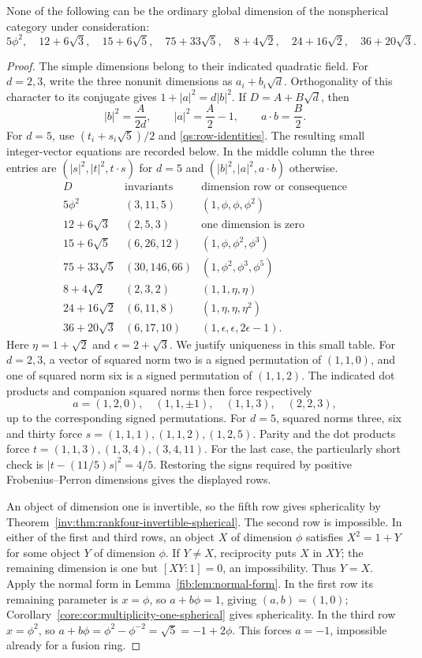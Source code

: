 \begin{lemma}\label{qs:ordinary-endpoints}
None of the following can be the ordinary global dimension of the
nonspherical category under consideration:
\[
 5\phi^2,\quad 12+6\sqrt3,\quad15+6\sqrt5,\quad
 75+33\sqrt5,\quad8+4\sqrt2,\quad24+16\sqrt2,\quad36+20\sqrt3.
\]
\end{lemma}
\begin{proof}
The simple dimensions belong to their indicated quadratic field.
For $d=2,3$, write the three nonunit dimensions as $a_i+b_i\sqrt d$.
Orthogonality of this character to its conjugate gives
$1+|a|^2=d|b|^2$. If $D=A+B\sqrt d$, then
\[
 |b|^2=\frac A{2d},\qquad |a|^2=\frac A2-1,
 \qquad a\cdot b=\frac B2.
\]
For $d=5$, use $(t_i+s_i\sqrt5)/2$ and
\eqref{qs:row-identities}. The resulting small integer-vector equations
are recorded below. In the middle column the three entries are
$(|s|^2,|t|^2,t\cdot s)$ for $d=5$ and
$(|b|^2,|a|^2,a\cdot b)$ otherwise.
\[
\begin{array}{c|c|l}
D&\text{invariants}&\text{dimension row or consequence}\\\hline
5\phi^2&(3,11,5)&(1,\phi,\phi,\phi^2)\\
12+6\sqrt3&(2,5,3)&\text{one dimension is zero}\\
15+6\sqrt5&(6,26,12)&(1,\phi,\phi^2,\phi^3)\\
75+33\sqrt5&(30,146,66)&(1,\phi^2,\phi^3,\phi^5)\\
8+4\sqrt2&(2,3,2)&(1,1,\eta,\eta)\\
24+16\sqrt2&(6,11,8)&(1,\eta,\eta,\eta^2)\\
36+20\sqrt3&(6,17,10)&(1,\epsilon,\epsilon,2\epsilon-1).
\end{array}
\]
Here $\eta=1+\sqrt2$ and $\epsilon=2+\sqrt3$.
We justify uniqueness in this small table. For $d=2,3$, a vector
of squared norm two is a signed permutation of $(1,1,0)$, and one
of squared norm six is a signed permutation of $(1,1,2)$.
The indicated dot products and companion squared norms then force
respectively
\[
 a=(1,2,0),\quad(1,1,\pm1),\quad(1,1,3),\quad(2,2,3),
\]
up to the corresponding signed permutations. For $d=5$, squared
norms three, six and thirty force $s=(1,1,1),(1,1,2),(1,2,5)$.
Parity and the dot products force $t=(1,1,3),(1,3,4),(3,4,11)$.
For the last case, the particularly short check is
$|t-(11/5)s|^2=4/5$. Restoring the signs required by positive
Frobenius--Perron dimensions gives the displayed rows.

An object of dimension one is invertible, so the fifth row gives
sphericality by Theorem~\ref{inv:thm:rankfour-invertible-spherical}.
The second row is impossible. In either of the first and third rows,
an object $X$ of dimension $\phi$ satisfies $X^2=1+Y$ for some object
$Y$ of dimension $\phi$. If $Y\ne X$, reciprocity puts $X$ in $XY$;
the remaining dimension is one but $[XY:1]=0$, an impossibility.
Thus $Y=X$. Apply the normal form in
Lemma~\ref{fib:lem:normal-form}. In the first row its remaining
parameter is $x=\phi$, so $a+b\phi=1$, giving $(a,b)=(1,0)$;
Corollary~\ref{core:cor:multiplicity-one-spherical} gives sphericality.
In the third row $x=\phi^2$, so
$a+b\phi=\phi^2-\phi^{-2}=\sqrt5=-1+2\phi$.
This forces $a=-1$, impossible already for a fusion ring.


\end{proof}

